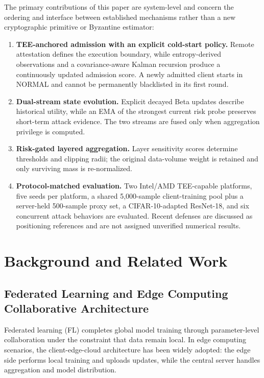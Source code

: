 \documentclass[11pt, a4paper]{article}
\begin{document}
The primary contributions of this paper are system-level and concern the
ordering and interface between established mechanisms rather than a new
cryptographic primitive or Byzantine estimator:
\begin{enumerate}
    \item \textbf{TEE-anchored admission with an explicit cold-start policy.} Remote attestation defines the execution boundary, while entropy-derived observations and a covariance-aware Kalman recursion produce a continuously updated admission score. A newly admitted client starts in NORMAL and cannot be permanently blacklisted in its first round.
    \item \textbf{Dual-stream state evolution.} Explicit decayed Beta updates describe historical utility, while an EMA of the strongest current risk probe preserves short-term attack evidence. The two streams are fused only when aggregation privilege is computed.
    \item \textbf{Risk-gated layered aggregation.} Layer sensitivity scores determine thresholds and clipping radii; the original data-volume weight is retained and only surviving mass is re-normalized.
    \item \textbf{Protocol-matched evaluation.} Two Intel/AMD TEE-capable platforms, five seeds per platform, a shared 5,000-sample client-training pool plus a server-held 500-sample proxy set, a CIFAR-10-adapted ResNet-18, and six concurrent attack behaviors are evaluated. Recent defenses are discussed as positioning references and are not assigned unverified numerical results.
\end{enumerate}

\section{Background and Related Work}

\subsection{Federated Learning and Edge Computing Collaborative Architecture}
Federated learning (FL) completes global model training through parameter-level collaboration under the constraint that data remain local. In edge computing scenarios, the client-edge-cloud architecture has been widely adopted: the edge side performs local training and uploads updates, while the central server handles aggregation and model distribution.
\end{document}
